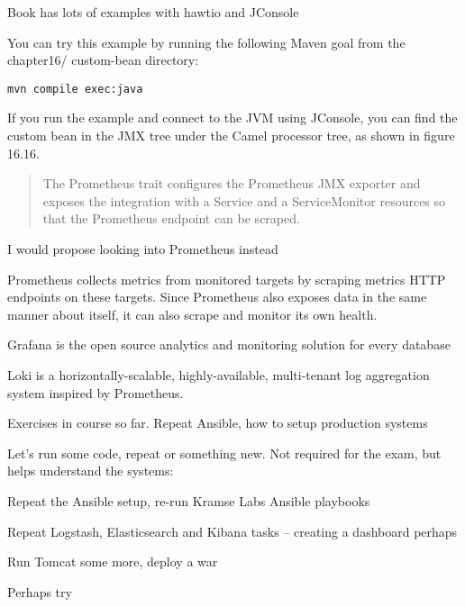\documentclass[Screen16to9,17pt]{foils}
\begin{document}

Book has lots of examples with hawtio and JConsole

You can try this example by running the following Maven goal from the chapter16/
custom-­bean directory:

\verb+mvn compile exec:java+

If you run the example and connect to the JVM using JConsole, you can find
the custom bean in the JMX tree under the Camel processor tree, as shown in figure 16.16.




\begin{quote}
The Prometheus trait configures the Prometheus JMX exporter and exposes the integration with a Service and a ServiceMonitor resources so that the Prometheus endpoint can be scraped.
\end{quote}

\begin{list2}
  \item I would propose looking into Prometheus instead
  \item {}
\end{list2}


\begin{list2}
  \item Prometheus collects metrics from monitored targets by scraping metrics HTTP endpoints on these targets. Since Prometheus also exposes data in the same manner about itself, it can also scrape and monitor its own health.\\
  \item Grafana is the open source analytics and monitoring solution for every database\\
  \item Loki is a horizontally-scalable, highly-available, multi-tenant log aggregation system inspired by Prometheus. \\
\end{list2}


Exercises in course so far. Repeat Ansible, how to setup production systems

Let's run some code, repeat or something new. Not required for the exam, but helps understand the systems:
\begin{list2}
\item Repeat the Ansible setup, re-run Kramse Labs Ansible playbooks
\item Repeat Logstash, Elasticsearch and Kibana tasks -- creating a dashboard perhaps
\item Run Tomcat some more, deploy a war
\item Perhaps try 
\end{list2}

\slidenext
\end{document}
